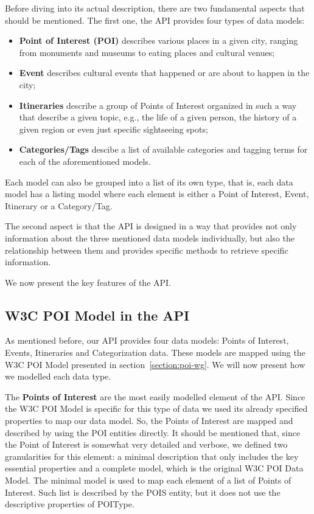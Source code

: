 \documentclass[times]{ettauth}
\begin{document}
Before diving into its actual description, there are two fundamental aspects that should be mentioned. The first one, the API provides four types of data models:
\begin{itemize}
\item \textbf{Point of Interest (POI)} describes various places in a given city, ranging from monuments and museums to eating places and cultural venues; 
\item \textbf{Event} describes cultural events that happened or are about to happen in the city;
\item \textbf{Itineraries} describe a group of Points of Interest organized in such a way that describe a given topic, e.g., the life of a given person, the history of a given region or even just specific sightseeing spots;
\item \textbf{Categories/Tags} descibe a list of available categories and tagging terms for each of the aforementioned models.
\end{itemize}

Each model can also be grouped into a list of its own type, that is, each data model has a listing model where each element is either a Point of Interest, Event, Itinerary or a Category/Tag.

The second aspect is that the API is designed in a way that provides not only information about the three mentioned data models individually, but also the relationship between them and provides specific methods to retrieve specific information.

We now present the key features of the API.

\subsection{W3C POI Model in the API}
\label{section:api-design}
As mentioned before, our API provides four data models: Points of Interest, Events, Itineraries and Categorization data. These models are mapped using the W3C POI Model presented in section~\ref{section:poi-wg}. We will now present how we modelled each data type.

The \textbf{Points of Interest} are the most easily modelled element of the API. Since the W3C POI Model is specific for this type of data we used its already specified properties to map our data model. So, the Points of Interest are mapped and described by using the POI entities directly. It should be mentioned that, since the Point of Interest is somewhat very detailed and verbose, we defined two granularities for this element: a minimal description that only includes the key essential properties and a complete model, which is the original W3C POI Data Model. The minimal model is used to map each element of a list of Points of Interest. Such list is described by the POIS entity, but it does not use the descriptive properties of POIType.
\end{document}
